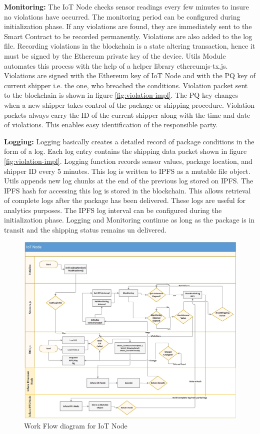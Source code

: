 \textbf{Monitoring:}
The IoT Node checks sensor readings every few minutes to insure no violations have occurred. The monitoring period can be configured during initialization phase. If any violations are found, they are immediately sent to the Smart Contract to be recorded permanently. Violations are also added to the log file. Recording violations in the blockchain is a state altering transaction, hence it must be signed by the Ethereum private key of the device. Utils Module automates this process with the help of a helper library ethereumjs-tx.js. Violations are signed with the Ethereum key of IoT Node and with the PQ key of current shipper i.e. the one, who breached the conditions. Violation packet sent to the blockchain is shown in figure \ref{fig:violation-impl}. The PQ key changes when a new shipper takes control of the package or shipping procedure.  Violation packets always carry the ID of the current shipper along with the time and date of violations. This enables easy identification of the responsible party.

\textbf{Logging:}
Logging basically creates a detailed record of package conditions in the form of a log.  Each log entry contains the shipping data packet shown in figure \ref{fig:violation-impl}. Logging function records sensor values, package location, and shipper ID every 5 minutes. This log is written to IPFS as a mutable file object. Utils appends new log chunks at the end of the previous log stored on IPFS. The IPFS hash for accessing this log is stored in the blockchain. This allows retrieval of complete logs after the package has been delivered. These logs are useful for analytics purposes. The IPFS log interval can be configured during the initialization phase. Logging and Monitoring continue as long as the package is in transit and the shipping status remains un delivered.

\begin{figure}[h]
	\centering
    \includegraphics[width=180mm,scale=1]{figs/IoTNode}
	\caption{Work Flow diagram for IoT Node}
	\label{fig:IoTNode} 
\end{figure}
\clearpage

